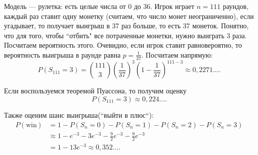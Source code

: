 \begin{example} Модель --- рулетка: есть целые числа от $0$ до $36$. Игрок играет $n=111$ раундов, каждый раз ставит одну монетку (считаем, что число монет неограниченно), если угадывает, то получает выигрыш в 37 раз больше, то есть 37 монеток. Понятно, что для того, чтобы ``отбить" все потраченные монетки, нужно выиграть 3 раза. Посчитаем вероятность этого. Очевидно, если игрок ставит равновероятно, то вероятность выигрыша в раунде равна $p=\frac{1}{37}$.
   Посчитаем напрямую:
    $$P(S_{111} = 3) = \binom{111}{3}\left(\frac{1}{37}\right)^3\left(1-\frac{1}{37}\right)^{111-3} \approx 0,2271\ldots.$$ 

    Если воспользуемся теоремой Пуассона, то получим оценку
    $$P(S_{111} = 3) \approx 0,224\ldots.$$
    
   Также оценим шанс выигрыша(``выйти в плюс``):
   \begin{align*}
       P(\text{win}) &= 1 - P(S_n = 0) - P(S_n = 1) - P(S_n = 2) - P(S_n = 3) \\&\approx
        1 - e^{-3} - 3e^{-3} - \frac{9}{2}e^{-3} - \frac{9}{2}e^{-3} \\&= 1 - 13e^{-3}\approx 0,352\ldots.
   \end{align*}
  
\end{example}

